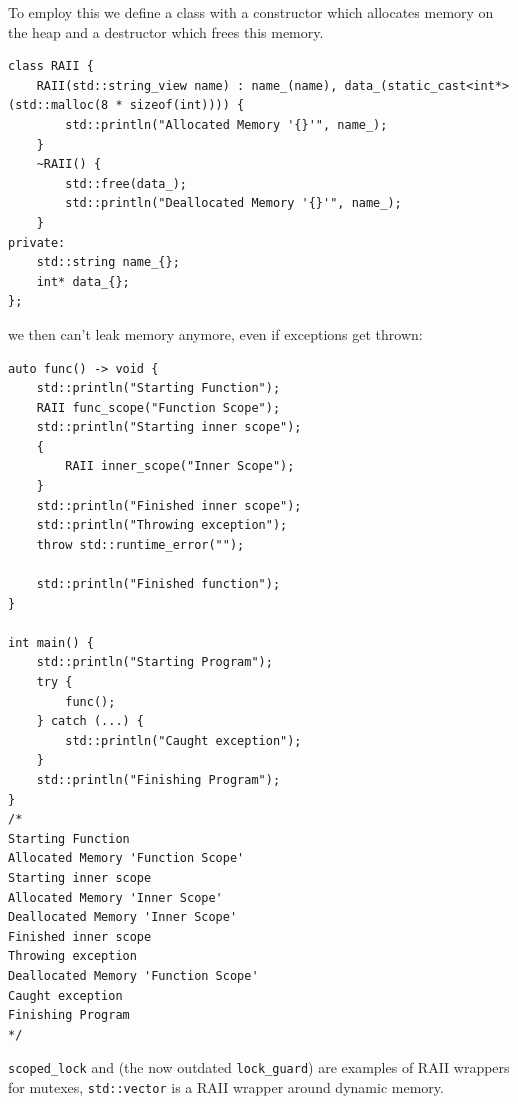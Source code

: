 \documentclass{article}
\begin{document}
To employ this we define a class with a constructor which allocates memory on the heap and a destructor which frees this memory.
\begin{lstlisting}
class RAII {
    RAII(std::string_view name) : name_(name), data_(static_cast<int*>(std::malloc(8 * sizeof(int)))) {
        std::println("Allocated Memory '{}'", name_);
    }
    ~RAII() {
        std::free(data_);
        std::println("Deallocated Memory '{}'", name_);
    }
private:
    std::string name_{};
    int* data_{};
};
\end{lstlisting}
we then can't leak memory anymore, even if exceptions get thrown:
\begin{lstlisting}
auto func() -> void {
    std::println("Starting Function");
    RAII func_scope("Function Scope");
    std::println("Starting inner scope");
    {
        RAII inner_scope("Inner Scope");
    }
    std::println("Finished inner scope");
    std::println("Throwing exception");
    throw std::runtime_error("");

    std::println("Finished function");
}

int main() {
    std::println("Starting Program");
    try {
        func();
    } catch (...) {
        std::println("Caught exception");
    }
    std::println("Finishing Program");
}
/*
Starting Function
Allocated Memory 'Function Scope'
Starting inner scope
Allocated Memory 'Inner Scope'
Deallocated Memory 'Inner Scope'
Finished inner scope
Throwing exception
Deallocated Memory 'Function Scope'
Caught exception
Finishing Program
*/
\end{lstlisting}

\texttt{scoped\_lock} and (the now outdated \texttt{lock\_guard}) are examples of RAII wrappers for mutexes, \texttt{std::vector} is a RAII wrapper around dynamic memory.
\end{document}
